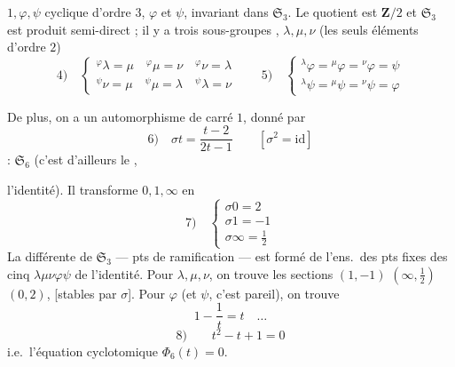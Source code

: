 \documentclass[11pt,a4paper]{article}
\begin{document}
$1,\varphi,\psi$ \ill{} \ill{} cyclique d'ordre $3$, %
 $\varphi$ et $\psi$, invariant dans $\mathfrak{S}_3$.
Le quotient est $\mathbf{Z}/2$ et $\mathfrak{S}_3$ est produit semi-direct ; il y a trois sous-groupes \ill{},
 $\lambda,\mu,\nu$ (les seuls éléments d'ordre $2$)
\[
4)\quad
\begin{cases}
{}^{\varphi}\lambda = \mu \quad {}^{\varphi}\mu = \nu \quad {}^{\varphi}\nu = \lambda\\
{}^{\psi}\nu = \mu \quad {}^{\psi}\mu = \lambda \quad {}^{\psi}\lambda = \nu
\end{cases}
\qquad
5)\quad
\begin{cases}
{}^{\lambda}\varphi = {}^{\mu}\varphi = {}^{\nu}\varphi = \psi\\
{}^{\lambda}\psi = {}^{\mu}\psi = {}^{\nu}\psi = \varphi
\end{cases}
\]

De plus, on a  un automorphisme
\struck{\ill{}} de carré $1$, donné par
\[
6)\quad \sigma t = \frac{t-2}{2t-1} \qquad [\sigma^2 = \mathrm{id}]
\]
 : $\mathfrak{S}_6$ (c'est d'ailleurs le
, 

l'identité). Il transforme $0,1,\infty$ en %
\[
7)\quad
\begin{cases}
\sigma 0 = 2\\
\sigma 1 = -1\\
\sigma\infty = \tfrac12
\end{cases}
\]
La différente de $\mathfrak{S}_3$ ---  pts de
ramification --- est formé de l'ens.\ des pts fixes
 des cinq  $\lambda\mu\nu\varphi\psi$ 
de l'identité. Pour $\lambda,\mu,\nu$, on trouve les sections $(1,-1)$
$(\infty,\tfrac12)$ $(0,2)$, [stables par $\sigma$]. Pour
$\varphi$ (et $\psi$, c'est pareil), on trouve
\[
1 - \frac1t = t \quad \ldots
\]
\[
8)\qquad t^2 - t + 1 = 0
\]
i.e.\ l'équation cyclotomique $\boxed{\Phi_6(t) = 0}$. 
\end{document}
